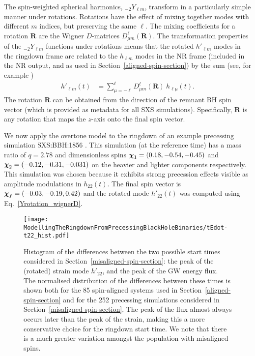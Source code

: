 The spin-weighted spherical harmonics, ${}_{-2}Y_{\ell m}$, transform in a particularly simple manner under rotations.
Rotations have the effect of mixing together modes with different $m$ indices, but preserving the same $\ell$. 
The mixing coefficients for a rotation $\mathbf{R}$ are the Wigner $D$-matrices $D^{\ell}_{\mu m} (\mathbf{R})$.
The transformation properties of the ${}_{-2}Y_{\ell m}$ functions under rotations means that the rotated $h'_{\ell m}$ modes in the ringdown frame are related to the $h_{\ell m}$ modes in the NR frame (included in the NR output, and as used in Section~\ref{aligned-spin-section}) by the sum (see, for example \cite{Boyle:2013nka, Schmidt:2010it, OShaughnessy:2011pmr})
\begin{align}\label{Yrotation_wignerD}
    h'_{\ell m}(t) &= \sum_{\mu = -\ell}^{\ell} D^{\ell}_{\mu m} (\mathbf{R}) ~ h_{\ell \mu}(t).
\end{align}
The rotation $\mathbf{R}$ can be obtained from the direction of the remnant BH spin vector (which is provided as metadata for all SXS simulations). Specifically, $\mathbf{R}$ is any rotation that maps the $z$-axis onto the final spin vector.

We now apply the overtone model to the ringdown of an example precessing simulation SXS:BBH:1856 \cite{Varma:2019csw}. 
This simulation (at the reference time) has a mass ratio of $q=2.78$ and dimensionless spins $\vb*{\chi}_1=(0.18, -0.54, -0.45)$ and $\vb*{\chi}_2=(-0.12, -0.31, -0.031)$ on the heavier and lighter components respectively. 
This simulation was chosen because it exhibits strong precession effects visible as amplitude modulations in $h_{22}(t)$. The final spin vector is $\vb*{\chi}_f=(-0.03,-0.19,0.42)$ and the rotated mode $h'_{22}(t)$ was computed using Eq.~\ref{Yrotation_wignerD}.

\begin{figure}[t]
    \centering
    \texttt{[image: ModellingTheRingdownFromPrecessingBlackHoleBinaries/tEdot-t22\_hist.pdf]}
    \caption[Differences between the times of peak strain and peak GW energy flux]{  
    Histogram of the differences between the two possible start times considered in Section~\ref{misaligned-spin-section}: the peak of the (rotated) strain mode $h'_{22}$, and the peak of the GW energy flux.
    The normalised distribution of the differences between these times is shown both for the 85 spin-aligned systems used in Section~\ref{aligned-spin-section} and for the 252 precessing simulations considered in Section~\ref{misaligned-spin-section}. 
    The peak of the flux almost always occurs later than the peak of the strain, making this a more conservative choice for the ringdown start time. 
    We note that there is a much greater variation amongst the population with misaligned spins.
    }
    \label{tEdot-t22}
\end{figure}

